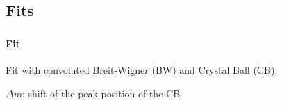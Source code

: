 \subsection{Fits}
\color{titlecolor}
\begin{frame}
  \frametitle{\dataSample}
  \framesubtitle{Fit \Zee}

  Fit with convoluted Breit-Wigner (BW) and Crystal Ball (CB).

  \bl
  $\Delta m$: shift of the peak position of the CB
  

  \dualslide{
  }{  
  }

  \bl
  \centering    \dataSample\xspace \invMassVarName

  
  \begin{block}{}
  \end{block}

\end{frame}

